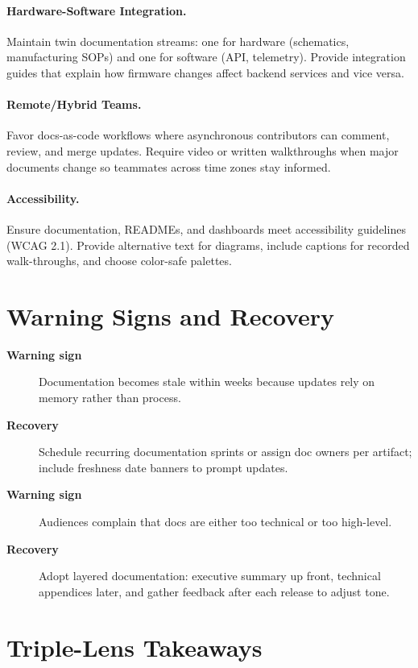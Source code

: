 \paragraph{Hardware-Software Integration.} Maintain twin documentation streams: one for hardware (schematics, manufacturing SOPs) and one for software (API, telemetry). Provide integration guides that explain how firmware changes affect backend services and vice versa.

\paragraph{Remote/Hybrid Teams.} Favor docs-as-code workflows where asynchronous contributors can comment, review, and merge updates. Require video or written walkthroughs when major documents change so teammates across time zones stay informed.

\paragraph{Accessibility.} Ensure documentation, READMEs, and dashboards meet accessibility guidelines (WCAG 2.1). Provide alternative text for diagrams, include captions for recorded walk-throughs, and choose color-safe palettes.
\section{Warning Signs and Recovery}
\label{sec:docs-warning}
\begin{description}
    \item[\textbf{Warning sign}] Documentation becomes stale within weeks because updates rely on memory rather than process.
    \item[\textbf{Recovery}] Schedule recurring documentation sprints or assign doc owners per artifact; include freshness date banners to prompt updates.
    \item[\textbf{Warning sign}] Audiences complain that docs are either too technical or too high-level.
    \item[\textbf{Recovery}] Adopt layered documentation: executive summary up front, technical appendices later, and gather feedback after each release to adjust tone.
\end{description}

\section{Triple-Lens Takeaways}
\label{sec:docs-triple}

